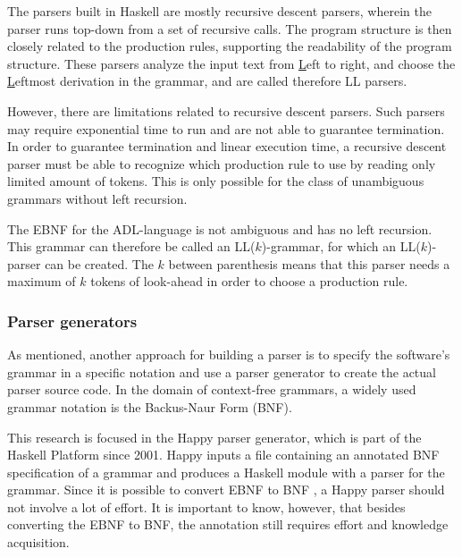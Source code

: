 The parsers built in Haskell are mostly recursive descent parsers, wherein the parser runs top-down from a set of recursive calls.
The program structure is then closely related to the production rules, supporting the readability of the program structure.
These parsers analyze the input text from \underline{L}eft to right, and choose the \underline{L}eftmost derivation in the grammar, and are called therefore LL parsers.

However, there are limitations related to recursive descent parsers.
Such parsers may require exponential time to run and are not able to guarantee termination.
In order to guarantee termination and linear execution time, a recursive descent parser must be able to recognize which production rule to use by reading only limited amount of tokens.
This is only possible for the class of unambiguous grammars without left recursion.

%
%
The EBNF for the ADL-language is not ambiguous and has no left recursion.
This grammar can therefore be called an LL($k$)-grammar, for which an LL($k$)-parser can be created.
The $k$ between parenthesis means that this parser needs a maximum of $k$ tokens of look-ahead in order to choose a production rule.

\subsubsection{Parser generators}
As mentioned, another approach for building a parser is to specify the software's grammar in a specific notation and use a parser generator to create the actual parser source code.
In the domain of context-free grammars, a widely used grammar notation is the Backus-Naur Form (BNF).

%
This research is focused in the Happy parser generator, which is part of the Haskell Platform since 2001.
Happy inputs a file containing an annotated BNF specification of a grammar and produces a Haskell module with a parser for the grammar.
Since it is possible to convert EBNF to BNF \cite{convert-ebnf} \cite{bnf-ebnf}, a Happy parser should not involve a lot of effort.
It is important to know, however, that besides converting the EBNF to BNF, the annotation still requires effort and knowledge acquisition.

